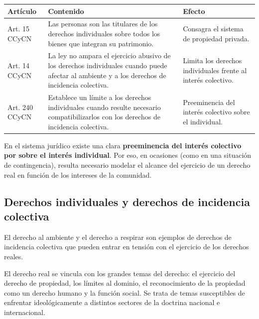 \documentclass[12pt,oneside]{book}
\begin{document}
\begin{center}
\small
\renewcommand{\arraystretch}{1.3}
\begin{tabularx}{\textwidth}{@{}>{\raggedright\arraybackslash}p{}>{\raggedright\arraybackslash}X>{\raggedright\arraybackslash}p{}@{}}
\toprule
\textbf{Artículo} & \textbf{Contenido} & \textbf{Efecto} \\
\midrule
Art. 15 CCyCN & Las personas son las titulares de los derechos individuales sobre todos los bienes que integran su patrimonio. & Consagra el sistema de propiedad privada. \\
Art. 14 CCyCN & La ley no ampara el ejercicio abusivo de los derechos individuales cuando puede afectar al ambiente y a los derechos de incidencia colectiva. & Limita los derechos individuales frente al interés colectivo. \\
Art. 240 CCyCN & Establece un límite a los derechos individuales cuando resulte necesario compatibilizarlos con los derechos de incidencia colectiva. & Preeminencia del interés colectivo sobre el individual. \\
\bottomrule
\end{tabularx}
\end{center}

En el sistema jurídico existe una clara \textbf{preeminencia del interés colectivo por sobre el interés individual}. Por eso, en ocasiones (como en una situación de contingencia), resulta necesario modelar el alcance del ejercicio de un derecho real en función de los intereses de la comunidad.

\subsection{Derechos individuales y derechos de incidencia colectiva}

El derecho al ambiente y el derecho a respirar son ejemplos de derechos de incidencia colectiva que pueden entrar en tensión con el ejercicio de los derechos reales.

El derecho real se vincula con los grandes temas del derecho: el ejercicio del derecho de propiedad, los límites al dominio, el reconocimiento de la propiedad como un derecho humano y la función social. Se trata de temas susceptibles de enfrentar ideológicamente a distintos sectores de la doctrina nacional e internacional.
\end{document}
